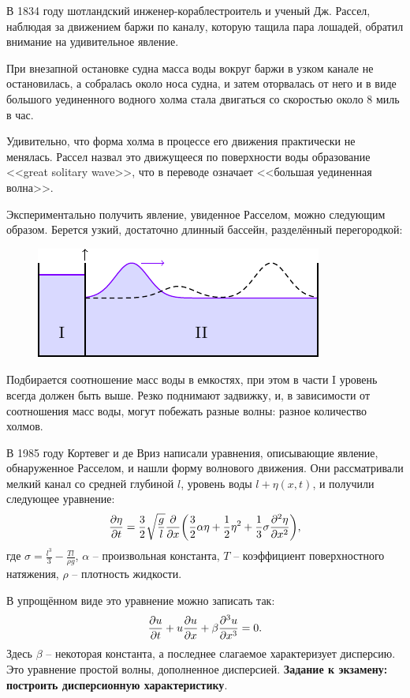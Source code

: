 В 1834 году шотландский инженер-кораблестроитель и ученый Дж. Рассел, наблюдая за движением баржи по каналу, которую тащила пара лошадей, обратил внимание на удивительное явление. 

При внезапной остановке судна масса воды вокруг баржи в узком канале не остановилась, а собралась около носа судна, и затем оторвалась от него и в виде большого уединенного водного холма стала двигаться со скоростью около 8 миль в час. 

Удивительно, что форма холма в процессе его движения практически не менялась. Рассел назвал это движущееся по поверхности воды образование <<great solitary wave>>, что в переводе означает <<большая уединенная волна>>.	

Экспериментально получить явление, увиденное Расселом, можно следующим образом. Берется узкий, достаточно длинный бассейн, разделённый перегородкой:  
\begin{figure}[H]
	\centering
	\includegraphics[scale=1.5]{img/soliton/pool}
\end{figure}
Подбирается соотношение масс воды в емкостях, при этом в части I уровень всегда должен быть выше. Резко поднимают задвижку, и, в зависимости от соотношения масс воды, могут побежать разные волны: разное количество холмов. 

В 1985 году Кортевег и де Вриз написали уравнения, описывающие явление, обнаруженное Расселом, и нашли форму волнового движения. Они рассматривали мелкий канал  со средней глубиной $l$, уровень воды $l+\eta(x,t)$, и получили следующее уравнение: 
\begin{equation*}
	\pdv{\eta}{t}=\frac32 \sqrt{\frac{g}{l}}\pdv{}{x}\qty(\frac32 \alpha \eta+\frac12 \eta^2+\frac13 \sigma \pdv[2]{\eta}{x}),
\end{equation*}
где $\sigma=\frac{l^3}{3}-\frac{Tl}{\rho g}$, $\alpha$ -- произвольная константа, $T$ -- коэффициент поверхностного натяжения, $\rho$ -- плотность жидкости.

В упрощённом виде это уравнение можно записать так:
\begin{equation}
	\pdv{u}{t}+u\pdv{u}{x}+\beta \pdv[3]{u}{x}=0.
	\label{eq:s3:1}
\end{equation}
Здесь $\beta$ -- некоторая константа, а последнее слагаемое характеризует дисперсию. Это уравнение простой волны, дополненное дисперсией. \textbf{Задание к  экзамену: построить дисперсионную характеристику}. 

